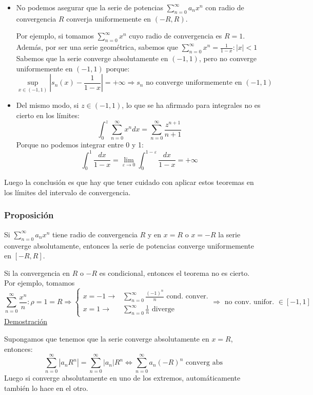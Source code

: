 \documentclass[10pt,a4paper,openright]{book}
\begin{document}
\begin{itemize}
\item No podemos asegurar que la serie de potencias $\sum_{n= 0}^{\infty} a_n x^n $ con radio de convergencia $R$ converja uniformemente en $(-R,R)$.

Por ejemplo, si tomamos $\sum_{n= 0 }^{\infty} x^n$ cuyo radio de convergencia es $R = 1$. Además, por ser una serie geométrica, sabemos que $\sum_{n= 0 }^{\infty} x^n = \frac{1}{1-x} : |x| < 1$
Sabemos que la serie converge absolutamente en $(-1,1)$, pero no converge uniformemente en $(-1,1)$ porque:
$$\underset{x \in (-1,1)}{\sup} |s_n (x) - \frac{1}{1-x}| = + \infty \Rightarrow s_n  \mbox{ no converge uniformemente en }(-1,1)$$

\item Del mismo modo, si $z \in (-1,1)$, lo que se ha afirmado para integrales no es cierto en los límites:
$$\int_{0}^{z} \sum_{n= 0}^{\infty} x^n dx = \sum_{n=0}^{\infty} \frac{z^{n+1}}{n+1}$$
Porque no podemos integrar entre 0 y 1:
$$\int_{0}^{1} \frac{dx}{1-x} = \lim_{\varepsilon \to 0}  \int_{0}^{1-\varepsilon} \frac{dx}{1-x} = + \infty$$
\end{itemize}
Luego la conclusión es que hay que tener cuidado con aplicar estos teoremas en los límites del intervalo de convergencia.

\subsubsection*{Proposición}
Si  $\sum_{n= 0}^{\infty} a_n x^n $ tiene radio de convergencia $R$ y en $x = R$ o $x = -R$ la serie converge absolutamente, entonces la serie de potencias converge uniformemente en $[-R, R]$.

Si la convergencia en $R$ o $-R$ es condicional, entonces el teorema no es cierto. Por ejemplo, tomamos
$$\sum_{n= 0 }^{\infty} \frac{x^n}{n} : \rho = 1 = R \Rightarrow \begin{cases} x=-1 \rightarrow & \sum_{n=0}^{\infty} \frac{(-1)^n}{n} \mbox{ cond. conver.} \\ x=1 \rightarrow & \sum_{n=0}^{\infty} \frac{1}{n} \mbox{ diverge}\end{cases}\Rightarrow \mbox{ no conv. unifor. } \in [-1,1]$$
\underline{Demostración}

Supongamos que tenemos que la serie converge absolutamente en $x = R$, entonces:
$$\sum_{n=0}^{\infty} |a_n R^n|= \sum_{n=0}^{\infty} |a_n| R^n \Leftrightarrow \sum_{n= 0}^{\infty} a_n(-R)^n \mbox{ converg abs}$$
Luego si converge absolutamente en uno de los extremos, automáticamente también lo hace en el otro.
\end{document}
